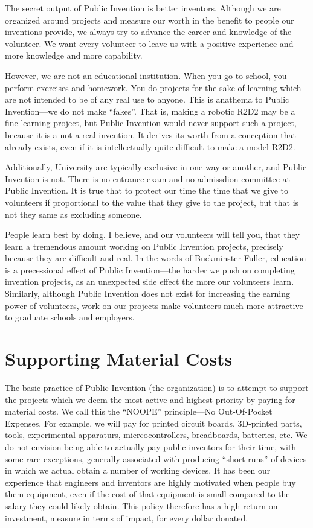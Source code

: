 \documentclass[
	fontsize=10pt, %
	twoside=false, %
	secnumdepth=1, %
]{kaobook}
\begin{document}
The secret output of Public Invention is better inventors.
Although we are organized around projects and
measure our worth in the benefit to people our inventions provide,
we always try to advance the career and knowledge of the volunteer.
We want every volunteer to leave us with a positive experience
and more knowledge and more capability.

However, we are not an educational institution.
When you go to school, you perform exercises and homework.
You do projects for the sake of learning which are not
intended to be of any real use to anyone.
This is anathema to Public Invention---we do not make ``fakes''.
That is, making a robotic R2D2 may be a fine learning
project, but Public Invention would never support such
a project, because it is a not a real invention.
It derives its worth from a conception that already exists,
even if it is intellectually quite difficult to make a model R2D2.

Additionally, University are typically exclusive in one way
or another, and Public Invention is not.
There is no entrance exam and no admissdion committee at Public Invention.
It is true that to protect our time the time that we give
to volunteers if proportional to the value that they give to the project,
but that is not they same as excluding someone.

People learn best by doing. I believe, and our volunteers
will tell you, that they learn a tremendous amount working
on Public Invention projects, precisely because they are difficult and real.
In the words of Buckminster Fuller, education is a precessional effect
of Public Invention---the harder we push on completing invention projects,
as an unexpected side effect the more our volunteers learn.
Similarly, although Public Invention does not exist for increasing the
earning power of volunteers, work on our projects make volunteers much more
attractive to graduate schools and employers.

\section{Supporting Material Costs}
\label{chp:material}

The basic practice of Public Invention (the organization) is to attempt to
support the projects which we deem the most active and highest-priority
by paying for material costs.
We call this the ``NOOPE'' principle---No Out-Of-Pocket Expenses.
For example, we will pay for printed circuit boards, 3D-printed parts, tools,
experimental apparaturs, micrcocontrollers, breadboards, batteries, etc.
We do not envision being able to actually pay public inventors for their
time, with some rare exceptions, generally associated with producing
``short runs'' of devices in which we actual obtain a number of working devices.
It has been our experience that engineers and inventors are highly motivated when people
buy them equipment, even if the cost of that equipment is small compared to the
salary they could likely obtain.
This policy therefore has a high return on investment, measure in terms of impact,
for every dollar donated.
\end{document}
